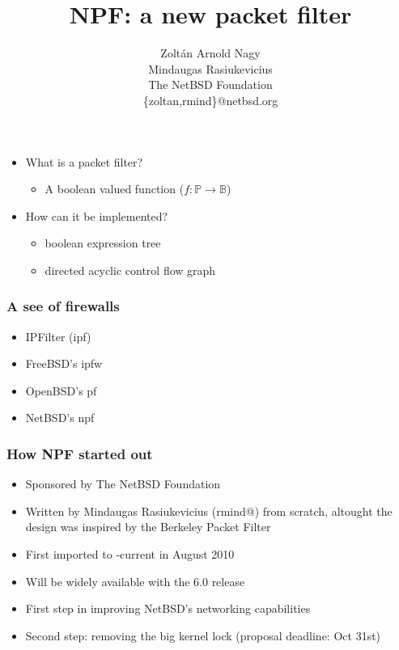 \documentclass[magyar]{beamer}
\date{}
\begin{document}
\title{NPF: a new packet filter}
\author{Zoltán Arnold Nagy\\ Mindaugas Rasiukevicius \\ The NetBSD Foundation \\ \{zoltan,rmind\}@netbsd.org}
\maketitle

\begin{frame}
\begin{itemize}
	\item What is a packet filter?
\pause
	\begin{itemize}
		\item A boolean valued function ($f:\mathbb{P} \rightarrow \mathbb{B}$)
	\end{itemize}
\pause
	\item How can it be implemented?
\pause
	\begin{itemize}
		\item boolean expression tree
		\item directed acyclic control flow graph
	\end{itemize}
\end{itemize}
\end{frame}

\begin{frame}
\frametitle{A see of firewalls}
\begin{itemize}
	\item IPFilter (ipf)
	\item FreeBSD's ipfw
	\item OpenBSD's pf
	\item NetBSD's npf
\end{itemize}
\end{frame}

\begin{frame}
\frametitle{How NPF started out}
\begin{itemize}
	\item Sponsored by The NetBSD Foundation
	\item Written by Mindaugas Rasiukevicius (rmind@) from scratch, altought the design was inspired by the Berkeley Packet Filter
	\item First imported to -current in August 2010
	\item Will be widely available with the 6.0 release
	\item First step in improving NetBSD's networking capabilities
	\item Second step: removing the big kernel lock (proposal deadline: Oct 31st)
\end{itemize}
\end{frame}
\end{document}
